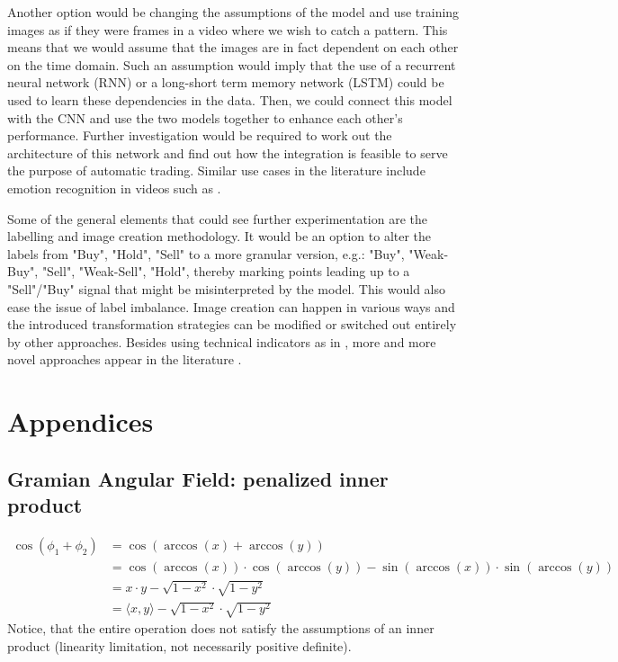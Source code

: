 \documentclass[11pt, a4paper]{article}
\begin{document}
Another option would be changing the assumptions of the model and use training images as if they were frames in a video where we wish to catch a pattern. This means that we would assume that the images are in fact dependent on each other on the time domain. Such an assumption would imply that the use of a recurrent neural network (RNN) or a long-short term memory network (LSTM) could be used to learn these dependencies in the data. Then, we could connect this model with the CNN and use the two models together to enhance each other's performance. Further investigation would be required to work out the architecture of this network and find out how the integration is feasible to serve the purpose of automatic trading. Similar use cases in the literature include emotion recognition in videos such as \cite{ebrahimi2015recurrent}.

Some of the general elements that could see further experimentation are the labelling and image creation methodology. It would be an option to alter the labels from "Buy", "Hold", "Sell" to a more granular version, e.g.: "Buy", "Weak-Buy", "Sell", "Weak-Sell", "Hold", thereby marking points leading up to a "Sell"/"Buy" signal that might be misinterpreted by the model. This would also ease the issue of label imbalance. Image creation can happen in various ways and the introduced transformation strategies can be modified or switched out entirely by other approaches. Besides using technical indicators as in \cite{sezer2018algorithmic}, more and more novel approaches appear in the literature \cite{sezer2019financial}.


\section{Appendices}
\label{sec:App}

\subsection{Gramian Angular Field: penalized inner product}
\label{app:GAF}
\begin{equation}
    \begin{split}
        \cos(\phi_1 + \phi_2)  & = \cos(\arccos(x) + \arccos(y)) \\
        & = \cos(\arccos(x)) \cdot \cos(\arccos(y)) - \sin(\arccos(x)) \cdot \sin(\arccos(y))\\
        & = x\cdot y - \sqrt{1-x^2} \cdot \sqrt{1-y^2}\\
        & = \langle x, y \rangle - \sqrt{1-x^2} \cdot \sqrt{1-y^2}
    \end{split}
\end{equation}
 Notice, that the entire operation does not satisfy the assumptions of an inner product (linearity limitation, not necessarily positive definite).
\end{document}
